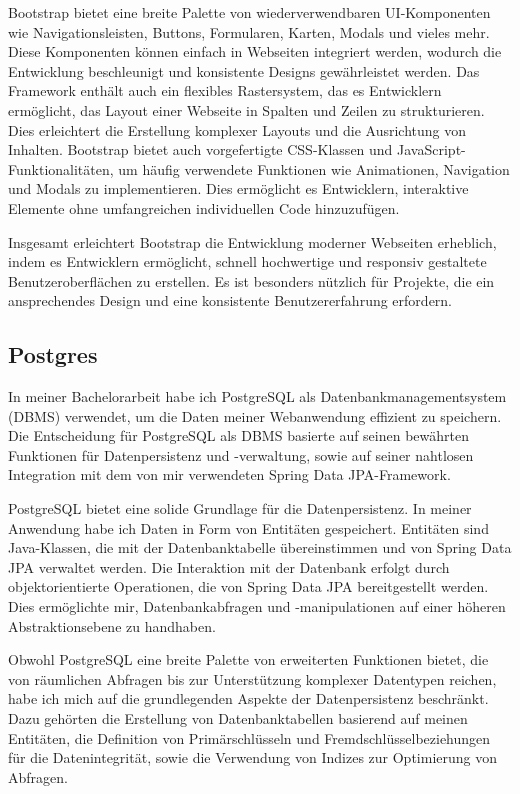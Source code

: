 \documentclass[fontsize=12pt,openright,oneside,paper=a4,BCOR=1cm]{scrbook}
\begin{document}
Bootstrap bietet eine breite Palette von wiederverwendbaren UI-Komponenten wie Navigationsleisten, Buttons, Formularen, Karten, Modals und vieles mehr. Diese Komponenten können einfach in Webseiten integriert werden, wodurch die Entwicklung beschleunigt und konsistente Designs gewährleistet werden.
Das Framework enthält auch ein flexibles Rastersystem, das es Entwicklern ermöglicht, das Layout einer Webseite in Spalten und Zeilen zu strukturieren. Dies erleichtert die Erstellung komplexer Layouts und die Ausrichtung von Inhalten.
Bootstrap bietet auch vorgefertigte CSS-Klassen und JavaScript-Funktionalitäten, um häufig verwendete Funktionen wie Animationen, Navigation und Modals zu implementieren. Dies ermöglicht es Entwicklern, interaktive Elemente ohne umfangreichen individuellen Code hinzuzufügen.

Insgesamt erleichtert Bootstrap die Entwicklung moderner Webseiten erheblich, indem es Entwicklern ermöglicht, schnell hochwertige und responsiv gestaltete Benutzeroberflächen zu erstellen. Es ist besonders nützlich für Projekte, die ein ansprechendes Design und eine konsistente Benutzererfahrung erfordern.

\subsection{Postgres}

In meiner Bachelorarbeit habe ich PostgreSQL als Datenbankmanagementsystem (DBMS) verwendet, um die Daten meiner Webanwendung effizient zu speichern. Die Entscheidung für PostgreSQL als DBMS basierte auf seinen bewährten Funktionen für Datenpersistenz und -verwaltung, sowie auf seiner nahtlosen Integration mit dem von mir verwendeten Spring Data JPA-Framework.

PostgreSQL bietet eine solide Grundlage für die Datenpersistenz. In meiner Anwendung habe ich Daten in Form von Entitäten gespeichert. Entitäten sind Java-Klassen, die mit der Datenbanktabelle übereinstimmen und von Spring Data JPA verwaltet werden. Die Interaktion mit der Datenbank erfolgt durch objektorientierte Operationen, die von Spring Data JPA bereitgestellt werden. Dies ermöglichte mir, Datenbankabfragen und -manipulationen auf einer höheren Abstraktionsebene zu handhaben.

Obwohl PostgreSQL eine breite Palette von erweiterten Funktionen bietet, die von räumlichen Abfragen bis zur Unterstützung komplexer Datentypen reichen, habe ich mich auf die grundlegenden Aspekte der Datenpersistenz beschränkt. Dazu gehörten die Erstellung von Datenbanktabellen basierend auf meinen Entitäten, die Definition von Primärschlüsseln und Fremdschlüsselbeziehungen für die Datenintegrität, sowie die Verwendung von Indizes zur Optimierung von Abfragen.
\end{document}
